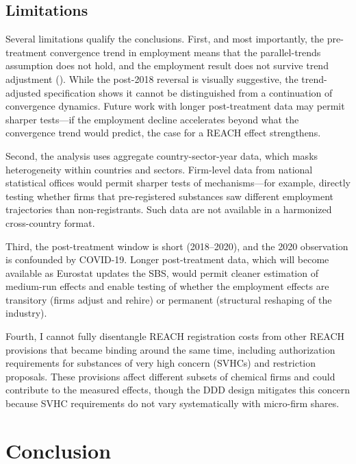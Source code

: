 \documentclass[12pt]{article}
\begin{document}
\subsection{Limitations}

Several limitations qualify the conclusions. First, and most importantly, the pre-treatment convergence trend in employment means that the parallel-trends assumption does not hold, and the employment result does not survive trend adjustment (). While the post-2018 reversal is visually suggestive, the trend-adjusted specification shows it cannot be distinguished from a continuation of convergence dynamics. Future work with longer post-treatment data may permit sharper tests---if the employment decline accelerates beyond what the convergence trend would predict, the case for a REACH effect strengthens.

Second, the analysis uses aggregate country-sector-year data, which masks heterogeneity within countries and sectors. Firm-level data from national statistical offices would permit sharper tests of mechanisms---for example, directly testing whether firms that pre-registered substances saw different employment trajectories than non-registrants. Such data are not available in a harmonized cross-country format.

Third, the post-treatment window is short (2018--2020), and the 2020 observation is confounded by COVID-19. Longer post-treatment data, which will become available as Eurostat updates the SBS, would permit cleaner estimation of medium-run effects and enable testing of whether the employment effects are transitory (firms adjust and rehire) or permanent (structural reshaping of the industry).

Fourth, I cannot fully disentangle REACH registration costs from other REACH provisions that became binding around the same time, including authorization requirements for substances of very high concern (SVHCs) and restriction proposals. These provisions affect different subsets of chemical firms and could contribute to the measured effects, though the DDD design mitigates this concern because SVHC requirements do not vary systematically with micro-firm shares.


\section{Conclusion}
\label{sec:conclusion}
\end{document}
